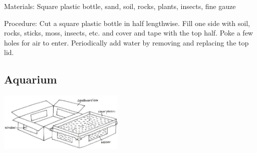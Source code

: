 \begin{multicols}{2}
\begin{description*}
\item[Materials:]{Square plastic bottle, sand, soil, rocks, plants, insects, fine gauze}
\item[Procedure:]{Cut a square plastic bottle in half lengthwise. Fill one side with soil, rocks, sticks, moss, insects, etc. and cover and tape with the top half. Poke a few holes for air to enter. Periodically add water by removing and replacing the top lid.}
\end{description*}

%
%

\subsection{Aquarium} %

\begin{center}
\includegraphics[width=0.45\textwidth]{./img/vso/aquarium.jpg}
\end{center}


\end{multicols}
